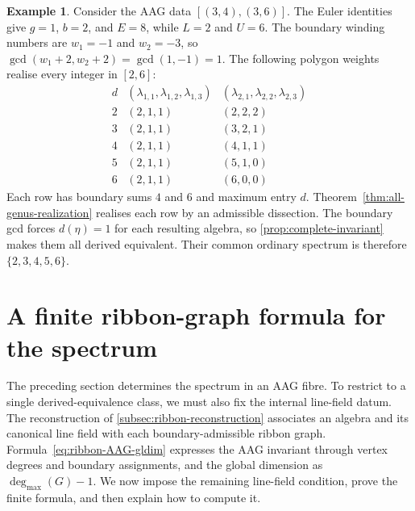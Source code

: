 \documentclass[11pt]{amsart}
\theoremstyle{definition}
\theoremstyle{plain}
\theoremstyle{definition}
\newtheorem{example}[example]{Example}
\theoremstyle{definition}
\newcommand{\degmax}{\deg_{\max}}
\begin{document}
\begin{samepage}
\begin{example}
\label{ex:positive-genus-interval}
Consider the AAG data $[(3,4),(3,6)]$.  The Euler identities give $g=1$,
$b=2$, and $E=8$, while $L=2$ and $U=6$.  The boundary winding numbers are $w_1=-1$ and $w_2=-3$, so
$\gcd(w_1+2,w_2+2)=\gcd(1,-1)=1$.
The following polygon weights realise every integer in $[2,6]$:
\[
\begin{array}{c|c|c}
 d & (\lambda_{1,1},\lambda_{1,2},\lambda_{1,3})
   & (\lambda_{2,1},\lambda_{2,2},\lambda_{2,3})\\ \hline
 2&(2,1,1)&(2,2,2)\\
 3&(2,1,1)&(3,2,1)\\
 4&(2,1,1)&(4,1,1)\\
 5&(2,1,1)&(5,1,0)\\
 6&(2,1,1)&(6,0,0)
\end{array}
\]
Each row has boundary sums $4$ and $6$ and maximum entry $d$.
Theorem~\ref{thm:all-genus-realization} realises each row by an admissible
dissection.  The boundary gcd forces $d(\eta)=1$ for each resulting
algebra, so \cref{prop:complete-invariant} makes them all derived equivalent.
Their common ordinary spectrum is therefore $\{2,3,4,5,6\}$.
\end{example}
\end{samepage}
\section{A finite ribbon-graph formula for the spectrum}
\label{sec:finite-formula}

The preceding section determines the spectrum in an AAG fibre.
To restrict to a single derived-equivalence class, we must also fix
the internal line-field datum.  The reconstruction of
\cref{subsec:ribbon-reconstruction} associates an algebra and its
canonical line field with each boundary-admissible ribbon graph.
Formula~\eqref{eq:ribbon-AAG-gldim} expresses the AAG invariant
through vertex degrees and boundary assignments, and the global
dimension as $\degmax(G)-1$.  We now impose the remaining line-field
condition, prove the finite formula, and then explain how to compute it.
\end{document}
